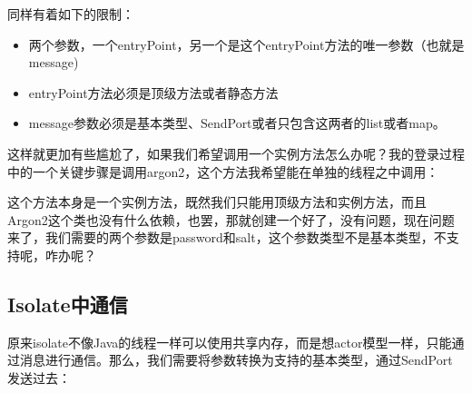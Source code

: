 \documentclass[12pt]{article}
\begin{document}
同样有着如下的限制：

\begin{itemize}
\tightlist
\item
  两个参数，一个entryPoint，另一个是这个entryPoint方法的唯一参数（也就是message)
\item
  entryPoint方法必须是顶级方法或者静态方法
\item
  message参数必须是基本类型、SendPort或者只包含这两者的list或者map。
\end{itemize}

这样就更加有些尴尬了，如果我们希望调用一个实例方法怎么办呢？我的登录过程中的一个关键步骤是调用argon2，这个方法我希望能在单独的线程之中调用：

\begin{Shaded}
\begin{Highlighting}[]
\OperatorTok{\{}
  \OperatorTok{\textless{}}\OperatorTok{\textgreater{}}\OperatorTok{,} \OperatorTok{\{}
\OperatorTok{=} 
     \OperatorTok{,}
  \OperatorTok{\}}
\OperatorTok{\}}
\end{Highlighting}
\end{Shaded}

这个方法本身是一个实例方法，既然我们只能用顶级方法和实例方法，而且Argon2这个类也没有什么依赖，也罢，那就创建一个好了，没有问题，现在问题来了，我们需要的两个参数是password和salt，这个参数类型不是基本类型，不支持呢，咋办呢？

\subsection{Isolate中通信}\label{isolateux4e2dux901aux4fe1}

原来isolate不像Java的线程一样可以使用共享内存，而是想actor模型一样，只能通过消息进行通信。那么，我们需要将参数转换为支持的基本类型，通过SendPort发送过去：
\end{document}
